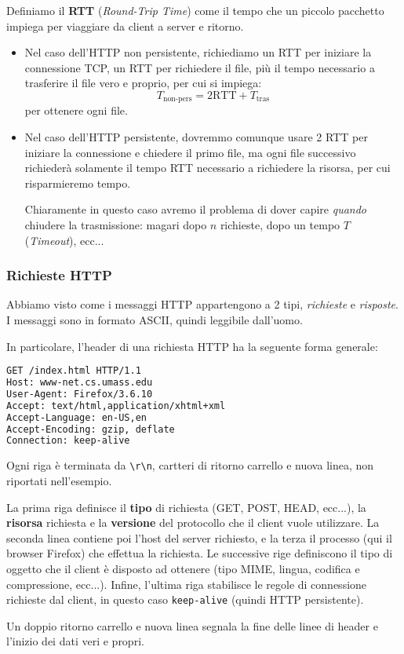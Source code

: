 \documentclass[a4paper,11pt]{article}
\begin{document}
Definiamo il \textbf{RTT} (\textit{Round-Trip Time}) come il tempo che un piccolo pacchetto impiega per viaggiare da client a server e ritorno.

\begin{itemize}
	\item 
Nel caso dell'HTTP non persistente, richiediamo un RTT per iniziare la connessione TCP, un RTT per richiedere il file, più il tempo necessario a trasferire il file vero e proprio, per cui si impiega:
$$
T_{\text{non-pers}} = 2 \text{RTT} + T_{\text{tras}}
$$
per ottenere ogni file.
	\item
Nel caso dell'HTTP persistente, dovremmo comunque usare 2 RTT per iniziare la connessione e chiedere il primo file, ma ogni file successivo richiederà solamente il tempo RTT necessario a richiedere la risorsa, per cui risparmieremo tempo.

Chiaramente in questo caso avremo il problema di dover capire \textit{quando} chiudere la trasmissione: magari dopo $n$ richieste, dopo un tempo $T$ (\textit{Timeout}), ecc...
\end{itemize}

\subsubsection{Richieste HTTP}
Abbiamo visto come i messaggi HTTP appartengono a 2 tipi, \textit{richieste} e \textit{risposte}.
I messaggi sono in formato ASCII, quindi leggibile dall'uomo.

In particolare, l'header di una richiesta HTTP ha la seguente forma generale:
\begin{lstlisting}[language=html,style=codestyle]	
GET /index.html HTTP/1.1
Host: www-net.cs.umass.edu
User-Agent: Firefox/3.6.10
Accept: text/html,application/xhtml+xml
Accept-Language: en-US,en
Accept-Encoding: gzip, deflate
Connection: keep-alive
\end{lstlisting}

Ogni riga è terminata da \lstinline|\r\n|, cartteri di ritorno carrello e nuova linea, non riportati nell'esempio.

La prima riga definisce il \textbf{tipo} di richiesta (GET, POST, HEAD, ecc...), la \textbf{risorsa} richiesta e la \textbf{versione} del protocollo che il client vuole utilizzare. 
La seconda linea contiene poi l'host del server richiesto, e la terza il processo (qui il browser Firefox) che effettua la richiesta.
Le successive rige definiscono il tipo di oggetto che il client è disposto ad ottenere (tipo MIME, lingua, codifica e compressione, ecc...).
Infine, l'ultima riga stabilisce le regole di connessione richieste dal client, in questo caso \lstinline|keep-alive| (quindi HTTP persistente).

Un doppio ritorno carrello e nuova linea segnala la fine delle linee di header e l'inizio dei dati veri e propri.
\end{document}
